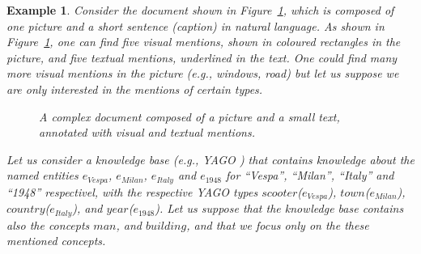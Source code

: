 \documentclass[11pt,a4paper]{article}
\newtheorem{example}{Example}[section]
\begin{document}
\begin{example}
	Consider the document shown in Figure~\ref{fig:ex_document}, which
	is composed of one picture 
	and a short sentence (caption) in natural language. As shown in
	Figure~\ref{fig:ex_document}, one can find five visual mentions,
	shown in coloured rectangles in the picture, and five textual
	mentions, underlined in the text. One could find many more
	visual mentions in the picture (e.g., windows, road) but let us suppose
	we are only interested in the mentions of certain types. 
	\begin{figure}
		\begin{center}
		\end{center}
		\caption{\label{fig:ex_document} A complex document composed of a
			picture and a small text, annotated with visual and textual mentions.}
	\end{figure}
	Let us consider a knowledge base (e.g., YAGO \cite{yago}) that
	contains knowledge about the named entities $e_{\textit{Vespa}}$,
	$e_{\textit{Milan}}$, $e_{\textit{Italy}}$ and $e_{\textit{1948}}$ for
	``Vespa'', ``Milan'', ``Italy'' and ``1948'' respectivel, with the
	respective YAGO types
	${\textit{scooter}}$($e_{\textit{Vespa}}$),
	${\textit{town}}$($e_{\textit{Milan}}$),
	${\textit{country}}$($e_{\textit{Italy}}$), and
	${\textit{year}}$($e_{\textit{1948}}$). Let us suppose that the
	knowledge base contains also the concepts $\textit{man}$, and
	$\textit{building}$, and that we focus only on the these mentioned
	concepts.
	

\end{example}
\end{document}
